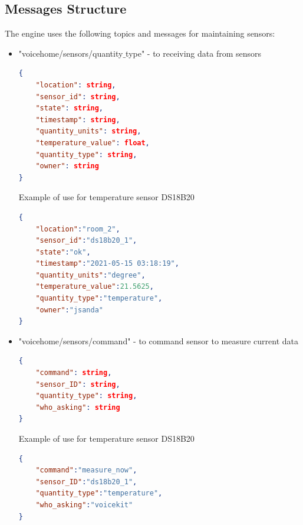 \subsection{Messages Structure}

The engine uses the following topics and messages for maintaining sensors:

\begin{itemize}
    \item "voicehome/sensors/quantity$\_$type" - to receiving data from sensors
    \begin{lstlisting}[language=json,firstnumber=1,caption={Structure of JSON message for receiving data from sensors in module \textit{Sensors}},captionpos=b,xleftmargin=1cm]
{
    "location": string,
    "sensor_id": string,
    "state": string,
    "timestamp": string,
    "quantity_units": string,
    "temperature_value": float,
    "quantity_type": string,
    "owner": string
}
    \end{lstlisting}
    Example of use for temperature sensor DS18B20
    \begin{lstlisting}[language=json,firstnumber=1,caption={Structure of JSON message for receiving data from temperature sensor DS18B20 in module \textit{Sensors}},captionpos=b,xleftmargin=1cm]
{
    "location":"room_2",
    "sensor_id":"ds18b20_1",
    "state":"ok",
    "timestamp":"2021-05-15 03:18:19",
    "quantity_units":"degree",
    "temperature_value":21.5625,
    "quantity_type":"temperature",
    "owner":"jsanda"
}
    \end{lstlisting}
    \item "voicehome/sensors/command" - to command sensor to measure current data
    \begin{lstlisting}[language=json,firstnumber=1,caption={Structure of JSON message to command sensor to measure current data in module \textit{Sensors}},captionpos=b,xleftmargin=1cm]
{
    "command": string,
    "sensor_ID": string,
    "quantity_type": string,
    "who_asking": string
}
    \end{lstlisting}
    Example of use for temperature sensor DS18B20
    \begin{lstlisting}[language=json,firstnumber=1,caption={Structure of JSON message to command sensor DS18B20 to measure current data in module \textit{Sensors}},captionpos=b,xleftmargin=1cm]
{
    "command":"measure_now",
    "sensor_ID":"ds18b20_1",
    "quantity_type":"temperature",
    "who_asking":"voicekit"
}
    \end{lstlisting}

\end{itemize}
